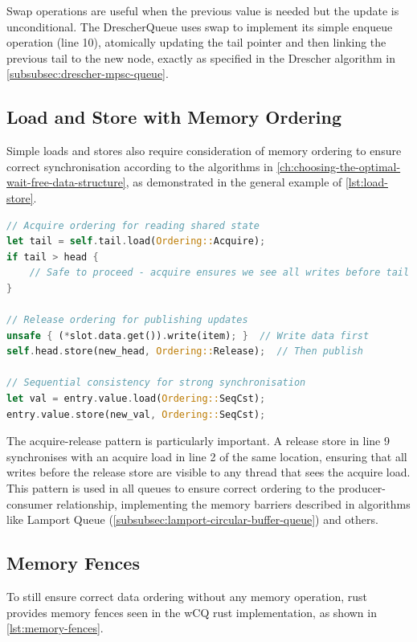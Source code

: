 Swap operations are useful when the previous value is needed but the update is unconditional. The DrescherQueue uses swap to implement its simple enqueue operation (line 10), atomically updating the tail pointer and then linking the previous tail to the new node, exactly as specified in the Drescher algorithm in \cref{subsubsec:drescher-mpsc-queue}.

\subsection{Load and Store with Memory Ordering}

Simple loads and stores also require consideration of memory ordering to ensure correct synchronisation according to the algorithms in \cref{ch:choosing-the-optimal-wait-free-data-structure}, as demonstrated in the general example of \cref{lst:load-store}.

\begin{lstlisting}[language=Rust, style=boxed, caption={Memory ordering for loads and stores}, label={lst:load-store}]
// Acquire ordering for reading shared state
let tail = self.tail.load(Ordering::Acquire);
if tail > head {
    // Safe to proceed - acquire ensures we see all writes before tail update
}

// Release ordering for publishing updates
unsafe { (*slot.data.get()).write(item); }  // Write data first
self.head.store(new_head, Ordering::Release);  // Then publish

// Sequential consistency for strong synchronisation
let val = entry.value.load(Ordering::SeqCst);
entry.value.store(new_val, Ordering::SeqCst);
\end{lstlisting}

The acquire-release pattern is particularly important. A release store in line 9 synchronises with an acquire load in line 2 of the same location, ensuring that all writes before the release store are visible to any thread that sees the acquire load. This pattern is used in all queues to ensure correct ordering to the producer-consumer relationship, implementing the memory barriers described in algorithms like Lamport Queue (\cref{subsubsec:lamport-circular-buffer-queue}) and others.

\subsection{Memory Fences}

To still ensure correct data ordering without any memory operation, rust provides memory fences seen in the \ac{wCQ} rust implementation, as shown in \cref{lst:memory-fences}.


